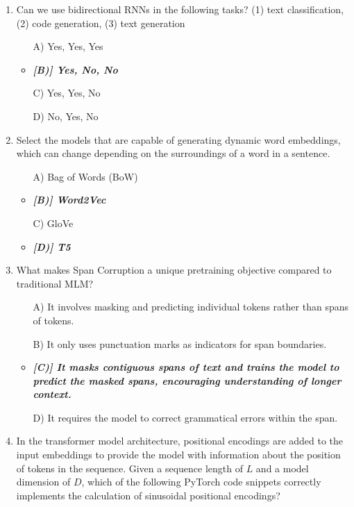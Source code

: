 \documentclass[10pt]{article}
\begin{document}
\begin{enumerate}
    \item Can we use bidirectional RNNs in the following tasks? (1) text classification, (2) code generation, (3) text generation
    \begin{itemize}
        \item[A)] Yes, Yes, Yes 
        \item\textit{\textbf{[B)] Yes, No, No} }
        \item[C)] Yes, Yes, No 
        \item[D)] No, Yes, No
    \end{itemize}


    \item Select the models that are capable of generating dynamic word embeddings, which can change depending on the surroundings of a word in a sentence.
    \begin{itemize}
        \item[A)] Bag of Words (BoW)
        \item\textbf{\textit{[B)] Word2Vec }}
        \item[C)] GloVe
        \item\textbf{\textit{[D)] T5}}
    \end{itemize}


    \item What makes Span Corruption a unique pretraining objective compared to traditional MLM?
    \begin{itemize}
        \item[A)] It involves masking and predicting individual tokens rather than spans of tokens.
        \item[B)] It only uses punctuation marks as indicators for span boundaries.
        \item\textbf{\textit{[C)] It masks contiguous spans of text and trains the model to predict the masked spans, encouraging understanding of longer context.}}
        \item[D)] It requires the model to correct grammatical errors within the span.
    \end{itemize}

    \item In the transformer model architecture, positional encodings are added to the input embeddings to provide the model with information about the position of tokens in the sequence. Given a sequence length of \(L\) and a model dimension of \(D\), which of the following PyTorch code snippets correctly implements the calculation of sinusoidal positional encodings?


\end{enumerate}
\end{document}
